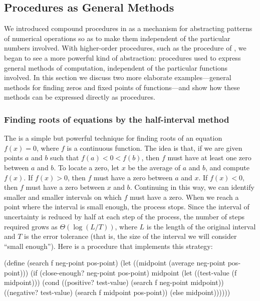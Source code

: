 \subsection{Procedures as General Methods}
\label{Section 1.3.3}

We introduced compound procedures in  as a mechanism for
abstracting patterns of numerical operations so as to make them independent of
the particular numbers involved.  With higher-order procedures, such as the
 procedure of , we began to see a more
powerful kind of abstraction: procedures used to express general methods of
computation, independent of the particular functions involved.  In this section
we discuss two more elaborate examples---general methods for finding zeros and
fixed points of functions---and show how these methods can be expressed
directly as procedures.

\subsubsection*{Finding roots of equations by the half-interval method}

The  is a simple but powerful technique for
finding roots of an equation \( f(x) = 0 \), where \( f \) is a continuous
function.  The idea is that, if we are given points \( a \) and \( b \) such that
\( f(a) < 0 < f(b) \), then \( f \) must have at least one zero between
\( a \) and \( b \).  To locate a zero, let \( x \) be the average of \( a \) and \( b \),
and compute \( f(x) \).  If \( f(x) > 0 \), then \( f \) must have a zero
between \( a \) and \( x \).  If \( f(x) < 0 \), then \( f \) must have a zero
between \( x \) and \( b \).  Continuing in this way, we can identify smaller and
smaller intervals on which \( f \) must have a zero.  When we reach a point where
the interval is small enough, the process stops.  Since the interval of
uncertainty is reduced by half at each step of the process, the number of steps
required grows as \( \Theta(\log(L / T)) \), where \( L \) is the
length of the original interval and \( T \) is the error tolerance (that is, the
size of the interval we will consider ``small enough'').  Here is a procedure
that implements this strategy:

\begin{codeBlock}
(define (search f neg-point pos-point)
  (let ((midpoint (average neg-point pos-point)))
    (if (close-enough? neg-point pos-point)
        midpoint
        (let ((test-value (f midpoint)))
          (cond ((positive? test-value)
                 (search f neg-point midpoint))
                ((negative? test-value)
                 (search f midpoint pos-point))
                (else midpoint))))))
\end{codeBlock}

